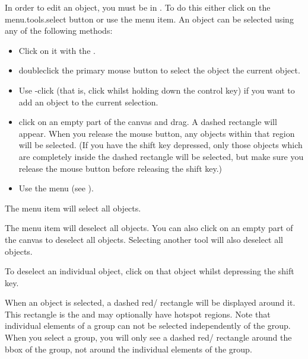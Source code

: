 
In order to edit an \gls{object}, you must be in \selectmode. To do
this either click on the \gls{menu.tools.select} button or use the 
 menu item. An \gls*{object} can
be selected using any of the following methods:
\begin{itemize}
\item Click on it with the .

\item \Gls{doubleclick} the primary mouse button to
select the \gls*{object}  the current \gls*{object}.

\item Use -click (that is, \gls{click} whilst holding down the control
 key) if you want to add an \gls*{object} to the current
selection.

\item \Gls{click} on an empty part of the \gls{canvas} and
drag. A dashed rectangle will appear. When you release the mouse
button, any \glspl*{object} within that
region will be selected. (If you have the shift  key depressed,
only those objects which are completely inside the dashed
rectangle will be selected, but make sure you release the mouse
button before releasing the shift key.)

\item Use the  menu (see ).

\end{itemize}


The  menu item will select all
\glspl{object}.


The  menu item will deselect all
\glspl{object}. You can also click on
an empty part of the \gls{canvas} to deselect all \glspl{object}.
Selecting another tool will also deselect all \glspl*{object}.

\begin{information}
To deselect an individual \gls*{object}, click on that object whilst
depressing the shift  key.
\end{information}

When an \gls{object} is selected, a dashed red\slash{}
rectangle will be displayed around it. This rectangle is the 
\emph{} and may optionally have
\gls{hotspot} regions. Note that individual elements of a
\gls{group} can not be selected independently of the group.  When
you select a group, you will only see a dashed
red\slash{} rectangle around the \gls{bbox} of the group,
not around the individual elements of the group.

